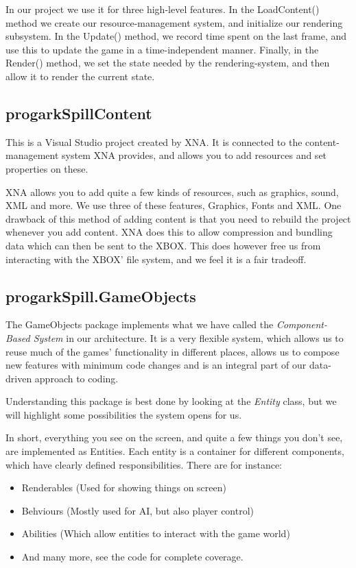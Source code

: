 In our project we use it for three high-level features. In the LoadContent()
method we create our resource-management system, and initialize our rendering
subsystem.  In the Update() method, we record time spent on the last frame, and
use this to update the game in a time-independent manner. Finally, in the
Render() method, we set the state needed by the rendering-system, and then
allow it to render the current state.

\subsection{progarkSpillContent}
This is a Visual Studio project created by XNA.  It is connected to the
content-management system XNA provides, and allows you to add resources and set
properties on these.

XNA allows you to add quite a few kinds of resources, such as graphics, sound, 
XML and more. We use three of these features, Graphics, Fonts and XML. One
drawback of this method of adding content is that you need to rebuild the
project whenever you add content. XNA does this to allow compression and 
bundling data which can then be sent to the XBOX. This does however free us
from interacting with the XBOX' file system, and we feel it is a fair tradeoff.

\subsection{progarkSpill.GameObjects}
The GameObjects package implements what we have called the \emph{Component-
Based System} in our architecture. It is a very flexible system, which allows
us to reuse much of the games' functionality in different places, allows us
to compose new features with minimum code changes and is an integral part of
our data-driven approach to coding.

Understanding this package is best done by looking at the \emph{Entity} class,
but we will highlight some possibilities the system opens for us.

In short, everything you see on the screen, and quite a few things you don't
see, are implemented as Entities. Each entity is a container for different
components, which have clearly defined responsibilities. There are for 
instance:
\begin{itemize}
    \item Renderables (Used for showing things on screen)
    \item Behviours (Mostly used for AI, but also player control)
    \item Abilities (Which allow entities to interact with the game world)
    \item And many more, see the code for complete coverage.
\end{itemize}

